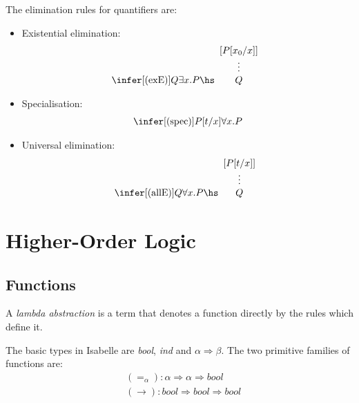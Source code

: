 \documentclass{article}
\begin{document}
\begin{definition}
    The elimination rules for quantifiers are:
    \begin{itemize}
        \item Existential elimination: \begin{align*}
            \infer[(\text{exE})]{Q}{\exists x.P\hs \begin{array}[b]{c}
                [P[x_0/x]]\\
                \vdots \\
                Q
            \end{array}}
        \end{align*}
        \item Specialisation: \begin{align*}
            \infer[(\text{spec})]{P[t/x]}{\forall x.P}
        \end{align*}
        \item Universal elimination: \begin{align*}
            \infer[(\text{allE})]{Q}{\forall x.P\hs \begin{array}[b]{c}
                [P[t/x]]\\
                \vdots \\
                Q
            \end{array}}
        \end{align*}
    \end{itemize}
\end{definition}

\section{Higher-Order Logic}

\subsection{Functions}

\begin{definition}
    A \emph{lambda abstraction} is a term that denotes a function directly by the 
    rules which define it.
\end{definition}

\begin{definition}
    The basic types in Isabelle are \emph{bool}, \emph{ind} and $\alpha\Rightarrow\beta$.
    The two primitive families of functions are:
    \begin{align*}
        &(=_\alpha): \alpha\Rightarrow \alpha \Rightarrow \textit{bool}\\
        &(\rightarrow): \textit{bool} \Rightarrow\textit{bool}\Rightarrow\textit{bool}
    \end{align*}
\end{definition}
\end{document}
